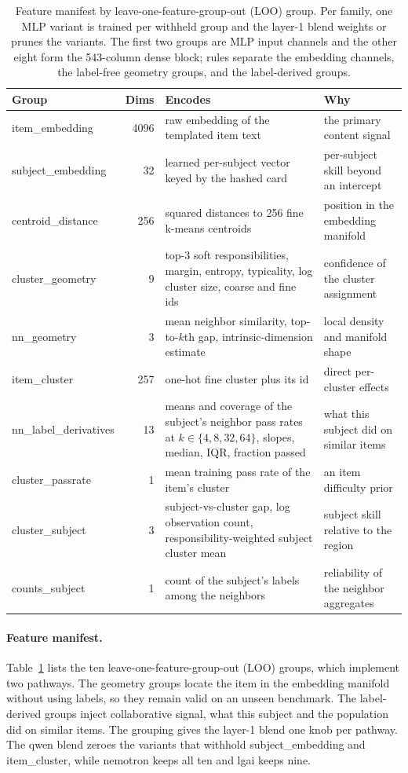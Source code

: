 \documentclass{article}
\begin{document}
\begin{table}[t]
\centering
\caption{Feature manifest by leave-one-feature-group-out (LOO) group. Per family, one MLP variant is trained per withheld group and the layer-1 blend weights or prunes the variants. The first two groups are MLP input channels and the other eight form the 543-column dense block; rules separate the embedding channels, the label-free geometry groups, and the label-derived groups.}
\label{tab:manifest}
\footnotesize
\renewcommand{\arraystretch}{0.95}
\setlength{\tabcolsep}{4pt}
\begin{tabular}{@{}l r p{5.4cm} p{4.2cm}@{}}
\toprule
Group & Dims & Encodes & Why \\
\midrule
item\_embedding & 4096 & raw embedding of the templated item text & the primary content signal \\
subject\_embedding & 32 & learned per-subject vector keyed by the hashed card & per-subject skill beyond an intercept \\
\midrule
centroid\_distance & 256 & squared distances to 256 fine k-means centroids & position in the embedding manifold \\
cluster\_geometry & 9 & top-3 soft responsibilities, margin, entropy, typicality, log cluster size, coarse and fine ids & confidence of the cluster assignment \\
nn\_geometry & 3 & mean neighbor similarity, top-to-$k$th gap, intrinsic-dimension estimate & local density and manifold shape \\
item\_cluster & 257 & one-hot fine cluster plus its id & direct per-cluster effects \\
\midrule
nn\_label\_derivatives & 13 & means and coverage of the subject's neighbor pass rates at $k\in\{4,8,32,64\}$, slopes, median, IQR, fraction passed & what this subject did on similar items \\
cluster\_passrate & 1 & mean training pass rate of the item's cluster & an item difficulty prior \\
cluster\_subject & 3 & subject-vs-cluster gap, log observation count, responsibility-weighted subject cluster mean & subject skill relative to the region \\
counts\_subject & 1 & count of the subject's labels among the neighbors & reliability of the neighbor aggregates \\
\bottomrule
\end{tabular}
\end{table}

\paragraph{Feature manifest.}
Table~\ref{tab:manifest} lists the ten leave-one-feature-group-out (LOO) groups, which implement two pathways. The geometry groups locate the item in the embedding manifold without using labels, so they remain valid on an unseen benchmark. The label-derived groups inject collaborative signal, what this subject and the population did on similar items. The grouping gives the layer-1 blend one knob per pathway. The qwen blend zeroes the variants that withhold subject\_embedding and item\_cluster, while nemotron keeps all ten and lgai keeps nine.
\end{document}
